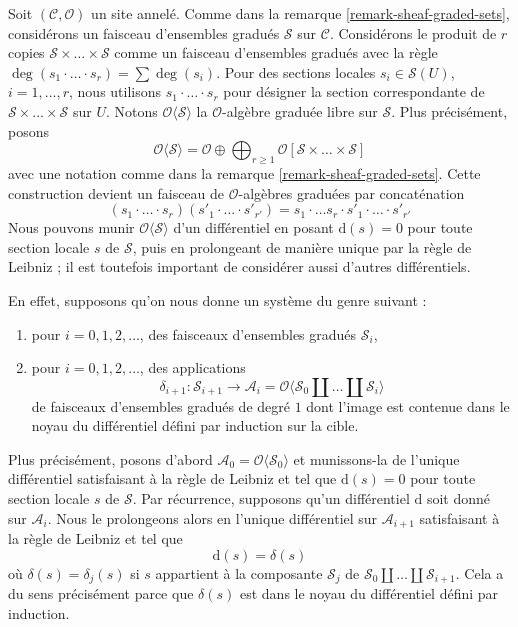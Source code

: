 \medskip\noindent
Soit $(\mathcal{C}, \mathcal{O})$ un site annelé. Comme dans la
remarque \ref{remark-sheaf-graded-sets}, considérons
un faisceau d'ensembles gradués $\mathcal{S}$ sur $\mathcal{C}$.
Considérons le produit de $r$ copies
$\mathcal{S} \times \ldots \times \mathcal{S}$ comme
un faisceau d'ensembles gradués avec la
règle $\deg(s_1 \cdot \ldots \cdot s_r) = \sum \deg(s_i)$.
Pour des sections locales $s_i \in \mathcal{S}(U)$, $i = 1, \ldots, r$, nous
utilisons $s_1 \cdot \ldots \cdot s_r$
pour désigner la section correspondante
de $\mathcal{S} \times \ldots \times \mathcal{S}$
sur $U$. Notons $\mathcal{O}\langle \mathcal{S} \rangle$ la
$\mathcal{O}$-algèbre graduée libre sur $\mathcal{S}$. Plus précisément,
posons
$$
\mathcal{O}\langle \mathcal{S} \rangle =
\mathcal{O} \oplus
\bigoplus\nolimits_{r \geq 1}
\mathcal{O}[\mathcal{S} \times \ldots \times \mathcal{S}]
$$ avec une notation comme dans
la remarque \ref{remark-sheaf-graded-sets}. Cette construction
devient un faisceau de $\mathcal{O}$-algèbres graduées par
concaténation
$$
(s_1 \cdot \ldots \cdot s_r) (s'_1 \cdot \ldots \cdot s'_{r'}) = s_1
\cdot \ldots s_r \cdot s'_1 \cdot \ldots \cdot s'_{r'}
$$ Nous pouvons
munir $\mathcal{O}\langle \mathcal{S} \rangle$ d'un
différentiel en posant $\text{d}(s) = 0$ pour toute section
locale $s$ de $\mathcal{S}$, puis en prolongeant
de manière unique par la règle de Leibniz ; il
est toutefois important de considérer aussi d'autres différentiels.

\medskip\noindent En
effet, supposons qu'on nous donne un système du genre suivant :
\begin{enumerate}
\item pour $i = 0, 1, 2, \ldots$, des faisceaux d'ensembles gradués $\mathcal{S}_i$,
\item pour $i = 0, 1, 2, \ldots$, des
applications $$
\delta_{i + 1} : \mathcal{S}_{i + 1}
\longrightarrow
\mathcal{A}_i
= \mathcal{O}\langle \mathcal{S}_0 \amalg \ldots \amalg \mathcal{S}_i\rangle
$$
de faisceaux d'ensembles gradués de degré $1$ dont l'image est
contenue dans le noyau du différentiel défini par induction sur la cible.
\end{enumerate} Plus
précisément, posons d'abord
$\mathcal{A}_0 = \mathcal{O}\langle \mathcal{S}_0 \rangle$ et
munissons-la de l'unique différentiel satisfaisant à la règle de Leibniz et tel que
$\text{d}(s) = 0$ pour toute section locale $s$ de $\mathcal{S}$. Par
récurrence, supposons qu'un différentiel $\text{d}$ soit donné
sur $\mathcal{A}_i$. Nous le prolongeons alors en
l'unique différentiel sur $\mathcal{A}_{i + 1}$ satisfaisant à la règle de
Leibniz
et tel que $$
\text{d}(s) = \delta(s)
$$
où $\delta(s) = \delta_j(s)$ si $s$ appartient à la composante $\mathcal{S}_j$
de $\mathcal{S}_0 \amalg \ldots \amalg \mathcal{S}_{i + 1}$.
Cela a du sens précisément parce que $\delta(s)$ est dans le
noyau du différentiel défini par induction.


